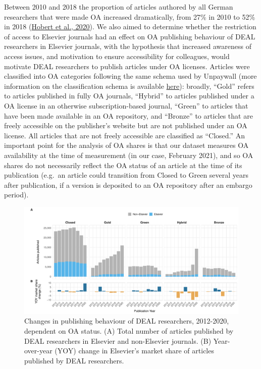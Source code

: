 \documentclass[
]{article}
\begin{document}
Between 2010 and 2018 the proportion of articles authored by all German researchers that were made OA increased dramatically, from 27\% in 2010 to 52\% in 2018 (\href{http://doi.org/10.5281/zenodo.3892951}{Hobert et al., 2020}). We also aimed to determine whether the restriction of access to Elsevier journals had an effect on OA publishing behaviour of DEAL researchers in Elsevier journals, with the hypothesis that increased awareness of access issues, and motivation to ensure accessibility for colleagues, would motivate DEAL researchers to publish articles under OA licenses. Articles were classified into OA categories following the same schema used by Unpaywall (more information on the classification schema is available \href{https://support.unpaywall.org/support/solutions/articles/44001777288-what-do-the-types-of-oa-status-green-gold-hybrid-and-bronze-mean-\#:~:text=Unpaywall\%20assigns\%20an\%20OA\%20Status,in\%20discussions\%20of\%20open\%20access.}{here}): broadly, ``Gold'' refers to articles published in fully OA journals, ``Hybrid'' to articles published under a OA license in an otherwise subscription-based journal, ``Green'' to articles that have been made available in an OA repository, and ``Bronze'' to articles that are freely accessible on the publisher's website but are not published under an OA license. All articles that are not freely accessible are classified as ``Closed.'' An important point for the analysis of OA shares is that our dataset measures OA availability at the time of measurement (in our case, February 2021), and so OA shares do not necessarily reflect the OA status of an article at the time of its publication (e.g.~an article could transition from Closed to Green several years after publication, if a version is deposited to an OA repository after an embargo period).

\begin{figure}

{\centering \includegraphics{analysis_files/figure-latex/items-publisher-year-oa-1} 

}

\caption{Changes in publishing behaviour of DEAL researchers, 2012-2020, dependent on OA status. (A) Total number of articles published by DEAL researchers in Elsevier and non-Elsevier journals. (B) Year-over-year (YOY) change in Elsevier's market share of articles published by DEAL researchers.}\label{fig:items-publisher-year-oa}
\end{figure}
\end{document}
